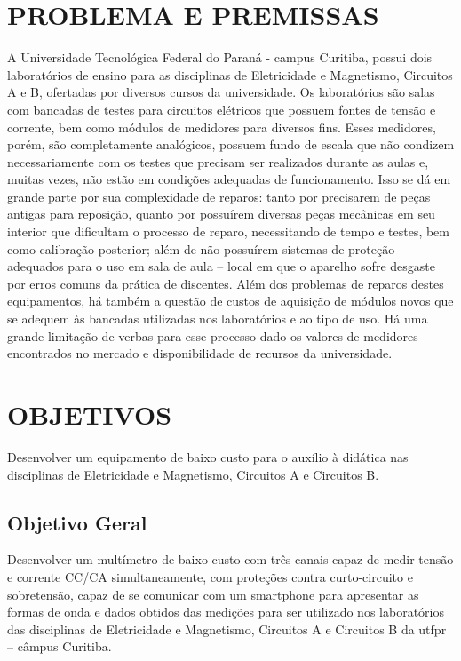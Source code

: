 \section{PROBLEMA E PREMISSAS}\label{sec:probpremiss}
A Universidade Tecnológica Federal do Paraná - campus Curitiba, possui dois laboratórios de ensino para as disciplinas de Eletricidade e Magnetismo, Circuitos A e B, ofertadas por diversos cursos da universidade. Os laboratórios são salas com bancadas de testes para circuitos elétricos que possuem fontes de tensão e corrente, bem como módulos de medidores para diversos fins.
Esses medidores, porém, são completamente analógicos, possuem fundo de escala que não condizem necessariamente com os testes que precisam ser realizados durante as aulas e, muitas vezes, não estão em condições adequadas de funcionamento. Isso se dá em grande parte por sua complexidade de reparos: tanto por precisarem de peças antigas para reposição, quanto por possuírem diversas peças mecânicas em seu interior que dificultam o processo de reparo, necessitando de tempo e testes, bem como calibração posterior; além de não possuírem sistemas de proteção adequados para o uso em sala de aula – local em que o aparelho sofre desgaste por erros comuns da prática de discentes.
Além dos problemas de reparos destes equipamentos, há também a questão de custos de aquisição de módulos novos que se adequem às bancadas utilizadas nos laboratórios e ao tipo de uso. Há uma grande limitação de verbas para esse processo dado os valores de medidores encontrados no mercado e disponibilidade de recursos da universidade.

\section{OBJETIVOS}\label{sec:objetivos}
Desenvolver um equipamento de baixo custo para o auxílio à didática nas disciplinas de Eletricidade e Magnetismo, Circuitos A e Circuitos B.

\subsection{Objetivo Geral}\label{sec:objgeral}
Desenvolver um multímetro de baixo custo com três canais capaz de medir tensão e corrente \gls{CC}/\gls{CA} simultaneamente, com proteções contra curto-circuito e sobretensão, capaz de se comunicar com um smartphone para apresentar as formas de onda e dados obtidos das medições para ser utilizado nos laboratórios das disciplinas de Eletricidade e Magnetismo, Circuitos A e Circuitos B da \gls{utfpr} – câmpus Curitiba.

